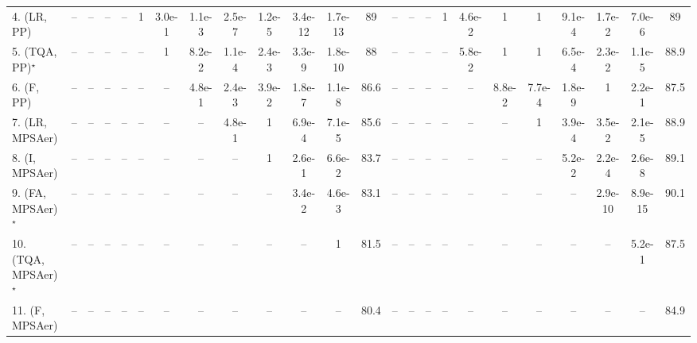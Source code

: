 \begin{table}[ht]
{\begin{tabular}{l|cccccccccccc|ccccccccccc|}
4. (LR, PP) & -- & -- & -- & -- & 1 & 3.0e-1 & {\cellcolor[HTML]{309950}} \color[HTML]{F1F1F1} 1.1e-3 & {\cellcolor[HTML]{00441B}} \color[HTML]{F1F1F1} 2.5e-7 & {\cellcolor[HTML]{00441B}} \color[HTML]{F1F1F1} 1.2e-5 & {\cellcolor[HTML]{00441B}} \color[HTML]{F1F1F1} 3.4e-12 & {\cellcolor[HTML]{00441B}} \color[HTML]{F1F1F1} 1.7e-13 & 89 & -- & -- & -- & 1 & {\cellcolor[HTML]{B5E1AE}} \color[HTML]{000000} 4.6e-2 & 1 & 1 & {\cellcolor[HTML]{00441B}} \color[HTML]{F1F1F1} 9.1e-4 & {\cellcolor[HTML]{B5E1AE}} \color[HTML]{000000} 1.7e-2 & {\cellcolor[HTML]{00441B}} \color[HTML]{F1F1F1} 7.0e-6 & 89 \\
5. (TQA, PP)$^\star$ & -- & -- & -- & -- & -- & 1 & 8.2e-2 & {\cellcolor[HTML]{00441B}} \color[HTML]{F1F1F1} 1.1e-4 & {\cellcolor[HTML]{309950}} \color[HTML]{F1F1F1} 2.4e-3 & {\cellcolor[HTML]{00441B}} \color[HTML]{F1F1F1} 3.3e-9 & {\cellcolor[HTML]{00441B}} \color[HTML]{F1F1F1} 1.8e-10 & 88 & -- & -- & -- & -- & 5.8e-2 & 1 & 1 & {\cellcolor[HTML]{00441B}} \color[HTML]{F1F1F1} 6.5e-4 & {\cellcolor[HTML]{B5E1AE}} \color[HTML]{000000} 2.3e-2 & {\cellcolor[HTML]{00441B}} \color[HTML]{F1F1F1} 1.1e-5 & 88.9 \\
6. (F, PP) & -- & -- & -- & -- & -- & -- & 4.8e-1 & {\cellcolor[HTML]{309950}} \color[HTML]{F1F1F1} 2.4e-3 & {\cellcolor[HTML]{B5E1AE}} \color[HTML]{000000} 3.9e-2 & {\cellcolor[HTML]{00441B}} \color[HTML]{F1F1F1} 1.8e-7 & {\cellcolor[HTML]{00441B}} \color[HTML]{F1F1F1} 1.1e-8 & 86.6 & -- & -- & -- & -- & -- & 8.8e-2 & {\cellcolor[HTML]{00441B}} \color[HTML]{F1F1F1} 7.7e-4 & {\cellcolor[HTML]{00441B}} \color[HTML]{F1F1F1} 1.8e-9 & 1 & 2.2e-1 & 87.5 \\
7. (LR, MPSAer) & -- & -- & -- & -- & -- & -- & -- & 4.8e-1 & 1 & {\cellcolor[HTML]{00441B}} \color[HTML]{F1F1F1} 6.9e-4 & {\cellcolor[HTML]{00441B}} \color[HTML]{F1F1F1} 7.1e-5 & 85.6 & -- & -- & -- & -- & -- & -- & 1 & {\cellcolor[HTML]{00441B}} \color[HTML]{F1F1F1} 3.9e-4 & {\cellcolor[HTML]{B5E1AE}} \color[HTML]{000000} 3.5e-2 & {\cellcolor[HTML]{00441B}} \color[HTML]{F1F1F1} 2.1e-5 & 88.9 \\
8. (I, MPSAer) & -- & -- & -- & -- & -- & -- & -- & -- & 1 & 2.6e-1 & 6.6e-2 & 83.7 & -- & -- & -- & -- & -- & -- & -- & 5.2e-2 & {\cellcolor[HTML]{00441B}} \color[HTML]{F1F1F1} 2.2e-4 & {\cellcolor[HTML]{00441B}} \color[HTML]{F1F1F1} 2.6e-8 & 89.1 \\
9. (FA, MPSAer)$^\star$ & -- & -- & -- & -- & -- & -- & -- & -- & -- & {\cellcolor[HTML]{B5E1AE}} \color[HTML]{000000} 3.4e-2 & {\cellcolor[HTML]{309950}} \color[HTML]{F1F1F1} 4.6e-3 & 83.1 & -- & -- & -- & -- & -- & -- & -- & -- & {\cellcolor[HTML]{00441B}} \color[HTML]{F1F1F1} 2.9e-10 & {\cellcolor[HTML]{00441B}} \color[HTML]{F1F1F1} 8.9e-15 & 90.1 \\
10. (TQA, MPSAer)$^\star$ & -- & -- & -- & -- & -- & -- & -- & -- & -- & -- & 1 & 81.5 & -- & -- & -- & -- & -- & -- & -- & -- & -- & 5.2e-1 & 87.5 \\
11. (F, MPSAer) & -- & -- & -- & -- & -- & -- & -- & -- & -- & -- & -- & 80.4 & -- & -- & -- & -- & -- & -- & -- & -- & -- & -- & 84.9 \\
\hline


\end{tabular}}
\end{table}
